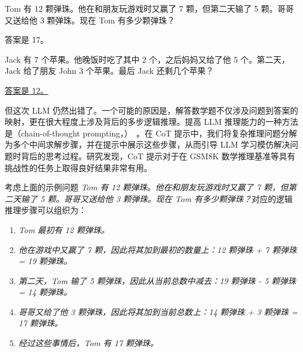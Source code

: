 \vspace{0.5em}
\begin{tcolorbox}
\begin{center}
\parbox{0.9\textwidth}
{

{\color{ugreen} Tom 有 12 颗弹珠。他在和朋友玩游戏时又赢了 7 颗，但第二天输了 5 颗。哥哥又送给他 3 颗弹珠。现在 Tom 有多少颗弹珠？}

\vspace{0.3em}

{\color{ugreen} 答案是 17。}

\vspace{0.3em}

{\color{blue} Jack 有 7 个苹果。他晚饭时吃了其中 2 个，之后妈妈又给了他 5 个。第二天，Jack 给了朋友 John 3 个苹果。最后 Jack 还剩几个苹果？}

\vspace{0.3em}

\underline{答案是 12。}

}
\end{center}
\end{tcolorbox}
\vspace{0.5em}

但这次 LLM 仍然出错了。一个可能的原因是，解答数学题不仅涉及问题到答案的映射，更在很大程度上涉及背后的多步逻辑推理。提高 LLM 推理能力的一种方法是（chain-of-thought prompting，）~\cite{wei-etal:2022chain}。在 CoT 提示中，我们将复杂推理问题分解为多个中间求解步骤，并在提示中展示这些步骤，从而引导 LLM 学习模仿解决问题时背后的思考过程。研究发现，CoT 提示对于在 GSM8K 数学推理基准等具有挑战性的任务上取得良好结果非常有用。

考虑上面的示例问题
\textit{Tom 有 12 颗弹珠。他在和朋友玩游戏时又赢了 7 颗，但第二天输了 5 颗。哥哥又送给他 3 颗弹珠。现在 Tom 有多少颗弹珠？}对应的逻辑推理步骤可以组织为：
\begin{enumerate}[leftmargin=3.5em]
\item[步骤 1：] \vspace{0.3em} \textit{Tom 最初有 12 颗弹珠。}
\item[步骤 2：] \vspace{0.1em} \textit{他在游戏中又赢了 7 颗，因此将其加到最初的数量上：12 颗弹珠 + 7 颗弹珠 = 19 颗弹珠。}
\item[步骤 3：] \vspace{0.1em} \textit{第二天，Tom 输了 5 颗弹珠，因此从当前总数中减去：19 颗弹珠 - 5 颗弹珠 = 14 颗弹珠。}
\item[步骤 4：] \vspace{0.1em} \textit{哥哥又给了他 3 颗弹珠，因此将其加到当前总数上：14 颗弹珠 + 3 颗弹珠 = 17 颗弹珠。}
\item[步骤 5：] \vspace{0.1em} \textit{经过这些事情后，Tom 有 17 颗弹珠。}
\end{enumerate}
\vspace{0.5em}

